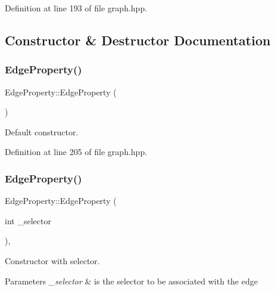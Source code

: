 Definition at line 193 of file graph.\+hpp.



\subsection{Constructor \& Destructor Documentation}
\mbox{\label{structEdgeProperty_ae217733737f635662fc0232c9d980f7c}} 
\subsubsection{\texorpdfstring{Edge\+Property()}{EdgeProperty()}\hspace{0.1cm}{\footnotesize\ttfamily [1/3]}}
{\footnotesize\ttfamily Edge\+Property\+::\+Edge\+Property (\begin{DoxyParamCaption}{ }\end{DoxyParamCaption})\hspace{0.3cm}{\ttfamily [inline]}}



Default constructor. 



Definition at line 205 of file graph.\+hpp.

\mbox{\label{structEdgeProperty_a288355a231baac5b98f7b5557e28d0e9}} 
\subsubsection{\texorpdfstring{Edge\+Property()}{EdgeProperty()}\hspace{0.1cm}{\footnotesize\ttfamily [2/3]}}
{\footnotesize\ttfamily Edge\+Property\+::\+Edge\+Property (\begin{DoxyParamCaption}\item[{int}]{\+\_\+selector }\end{DoxyParamCaption})\hspace{0.3cm}{\ttfamily [inline]}, {\ttfamily [explicit]}}



Constructor with selector. 


\begin{DoxyParams}{Parameters}
{\em \+\_\+selector} & is the selector to be associated with the edge \\
\hline
\end{DoxyParams}


